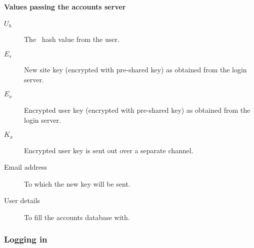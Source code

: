 \paragraph{Values passing the accounts server}
\begin{description}
\item[$U_h$]	The \SHA\ hash value from the user.
\item[$E_s$]	New site key (encrypted with pre-shared key) as obtained from the login server.
\item[$E_x$]	Encrypted user key (encrypted with pre-shared key) as obtained from the login server.
\item[$K_x$]	Encrypted user key is sent out over a separate channel.
\item[Email address]	To which the new key will be sent.
\item[User details]	To fill the accounts database with.
\end{description}
\subsubsection{Logging in}

